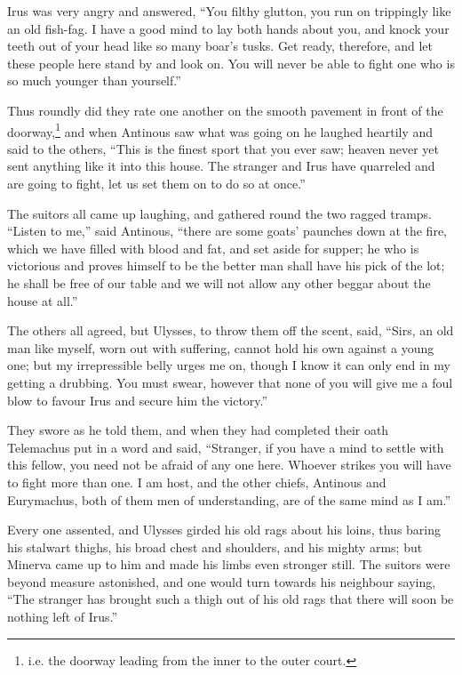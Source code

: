 Irus was very angry and answered, “You filthy glutton, you run on trippingly
like an old fish-fag. I have a good mind to lay both hands about you, and knock
your teeth out of your head like so many boar’s tusks. Get ready, therefore,
and let these people here stand by and look on. You will never be able to fight
one who is so much younger than yourself.”

Thus roundly did they rate one another on the smooth pavement in front of the
doorway,\footnote{i.e. the doorway leading from the inner to the outer court.} and
when Antinous saw what was going on he laughed heartily and said to the others,
“This is the finest sport that you ever saw; heaven never yet sent anything
like it into this house. The stranger and Irus have quarreled and are going to
fight, let us set them on to do so at once.”

The suitors all came up laughing, and gathered round the two ragged tramps.
“Listen to me,” said Antinous, “there are some goats’ paunches down at the
fire, which we have filled with blood and fat, and set aside for supper; he who
is victorious and proves himself to be the better man shall have his pick of
the lot; he shall be free of our table and we will not allow any other beggar
about the house at all.”

The others all agreed, but Ulysses, to throw them off the scent, said, “Sirs,
an old man like myself, worn out with suffering, cannot hold his own against a
young one; but my irrepressible belly urges me on, though I know it can only
end in my getting a drubbing. You must swear, however that none of you will
give me a foul blow to favour Irus and secure him the victory.”

They swore as he told them, and when they had completed their oath Telemachus
put in a word and said, “Stranger, if you have a mind to settle with this
fellow, you need not be afraid of any one here. Whoever strikes you will have
to fight more than one. I am host, and the other chiefs, Antinous and
Eurymachus, both of them men of understanding, are of the same mind as I am.”

Every one assented, and Ulysses girded his old rags about his loins, thus
baring his stalwart thighs, his broad chest and shoulders, and his mighty arms;
but Minerva came up to him and made his limbs even stronger still. The suitors
were beyond measure astonished, and one would turn towards his neighbour
saying, “The stranger has brought such a thigh out of his old rags that there
will soon be nothing left of Irus.”

